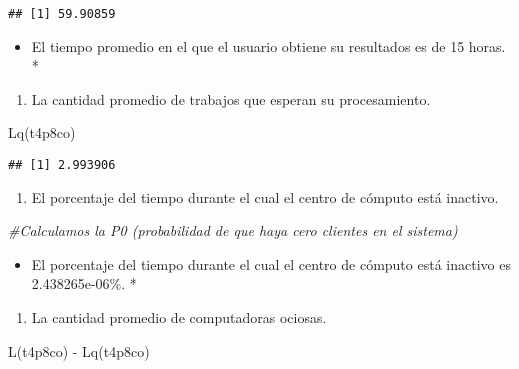\documentclass[
]{article}
\newenvironment{Shaded}{\begin{snugshade}}{\end{snugshade}}
\newcommand{\CommentTok}[1]{\textcolor[rgb]{0.56,0.35,0.01}{\textit{#1}}}
\newcommand{\FunctionTok}[1]{\textcolor[rgb]{0.00,0.00,0.00}{#1}}
\newcommand{\NormalTok}[1]{#1}
\newcommand{\SpecialCharTok}[1]{\textcolor[rgb]{0.00,0.00,0.00}{#1}}
\providecommand{\tightlist}{%
  \setlength{\itemsep}{0pt}\setlength{\parskip}{0pt}}
\begin{document}
\begin{verbatim}
## [1] 59.90859
\end{verbatim}

\begin{itemize}
\tightlist
\item
  El tiempo promedio en el que el usuario obtiene su resultados es de 15
  horas. *
\end{itemize}

\begin{enumerate}
\def\labelenumi{\alph{enumi})}
\setcounter{enumi}{2}
\tightlist
\item
  La cantidad promedio de trabajos que esperan su procesamiento.
\end{enumerate}

\begin{Shaded}
\begin{Highlighting}[]
\FunctionTok{Lq}\NormalTok{(t4p8co)}
\end{Highlighting}
\end{Shaded}

\begin{verbatim}
## [1] 2.993906
\end{verbatim}

\begin{enumerate}
\def\labelenumi{\alph{enumi})}
\setcounter{enumi}{3}
\tightlist
\item
  El porcentaje del tiempo durante el cual el centro de cómputo está
  inactivo.
\end{enumerate}

\begin{Shaded}
\begin{Highlighting}[]
\CommentTok{\#Calculamos la P0 (probabilidad de que haya cero clientes en el sistema)}
\end{Highlighting}
\end{Shaded}

\begin{itemize}
\tightlist
\item
  El porcentaje del tiempo durante el cual el centro de cómputo está
  inactivo es 2.438265e-06\%. *
\end{itemize}

\begin{enumerate}
\def\labelenumi{\alph{enumi})}
\setcounter{enumi}{4}
\tightlist
\item
  La cantidad promedio de computadoras ociosas.
\end{enumerate}

\begin{Shaded}
\begin{Highlighting}[]
\FunctionTok{L}\NormalTok{(t4p8co) }\SpecialCharTok{{-}} \FunctionTok{Lq}\NormalTok{(t4p8co)}
\end{Highlighting}
\end{Shaded}
\end{document}
